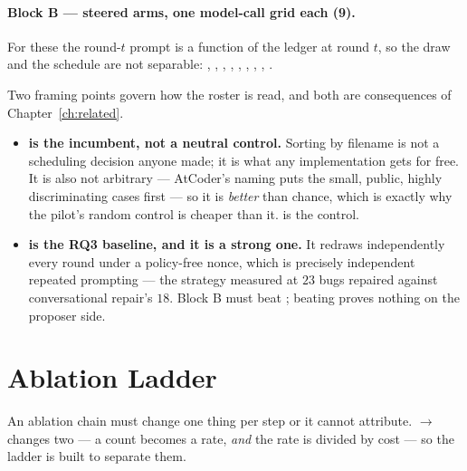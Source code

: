 \paragraph{Block B --- steered arms, one model-call grid each (9).} For these
the round-$t$ prompt is a function of the ledger at round $t$, so the draw and
the schedule are not separable: , ,
, , , ,
, , .

Two framing points govern how the roster is read, and both are consequences of
Chapter~\ref{ch:related}.

\begin{itemize}[leftmargin=*]
\item \textbf{ is the incumbent, not a neutral control.} Sorting
by filename is not a scheduling decision anyone made; it is what any
implementation gets for free. It is also not arbitrary --- AtCoder's naming
puts the small, public, highly discriminating cases first --- so it is
\emph{better} than chance, which is exactly why the pilot's random control is
cheaper than it.  is the control.
\item \textbf{ is the RQ3 baseline, and it is a strong one.} It
redraws independently every round under a policy-free nonce, which is precisely
independent repeated prompting --- the strategy
\citet{chen2025conversational} measured at $23$ bugs repaired against
conversational repair's $18$. Block B must beat ; beating
 proves nothing on the proposer side.
\end{itemize}

\section{Ablation Ladder}
\label{sec:ablation}

An ablation chain must change one thing per step or it cannot attribute.
 $\to$  changes two --- a count becomes a rate,
\emph{and} the rate is divided by cost --- so the ladder is built to separate
them.

